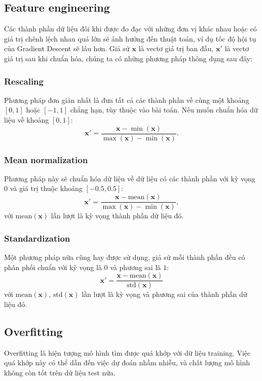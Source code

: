 \documentclass[]{article}
\begin{document}
\subsection{Feature engineering}
Các thành phần dữ liệu đôi khi được đo đạc với những đơn vị khác nhau hoặc có giá trị chênh lệch nhau quá lớn sẽ ảnh hưởng đến thuật toán, ví dụ tốc độ hội tụ của Gradient Descent sẽ lâu hơn. Giả sử $\textbf{x}$ là vectơ giá trị ban đầu, $\textbf{x}'$ là vectơ giá trị sau khi chuẩn hóa, chúng ta có những phương pháp thông dụng sau đây:
\subsubsection{Rescaling}
Phương pháp đơn giản nhất là đưa tất cả các thành phần về cùng một khoảng $[0, 1]$
hoặc $[-1, 1]$ chẳng hạn, tùy thuộc vào bài toán. Nếu muốn chuẩn hóa dữ liệu về khoảng $[0, 1]$:
$$\textbf{x}' = \frac{\textbf{x} - \min(\textbf{x})}{\max(\textbf{x}) - \min(\textbf{x})}.$$
\subsubsection{Mean normalization}
Phương pháp này sẽ chuẩn hóa dữ liệu về dữ liệu có các thành phần với kỳ vọng $0$ và giá trị thuộc khoảng $[-0.5, 0.5]$:
$$\textbf{x}' = \frac{\textbf{x} - \text{mean}(\textbf{x})}{\max(\textbf{x}) - \min(\textbf{x})},$$
với $\text{mean}(\textbf{x})$ lần lượt là kỳ vọng thành phần dữ liệu đó.
\subsubsection{Standardization}
Một phương pháp nữa cũng hay được sử dụng, giả sử mỗi thành phần đều có phân phối chuẩn với kỳ vọng là $0$ và phương sai là $1$:
$$\textbf{x}' = \frac{\textbf{x} - \text{mean}(\textbf{x})}{\text{std}(\textbf{x})}$$
với $\text{mean}(\textbf{x}),\, \text{std}(\textbf{x})$ lần lượt là kỳ vọng và phương sai của thành phần dữ liệu đó.

\subsection{Overfitting}
Overfitting là hiện tượng mô hình tìm được quá khớp với dữ liệu training.  Việc quá khớp này có thể dẫn đến việc dự đoán nhầm nhiễu, và chất lượng mô hình không còn tốt trên dữ liệu test nữa.
\end{document}
